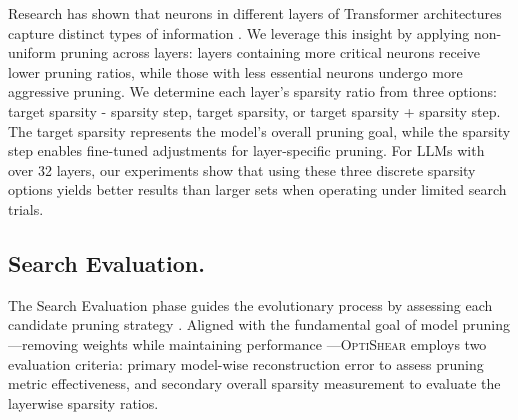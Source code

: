 Research has shown that neurons in different layers of Transformer architectures capture distinct types of information \citep{wang2020rethinking, zhang2021moefication}. We leverage this insight by applying non-uniform pruning across layers: layers containing more critical neurons receive lower pruning ratios, while those with less essential neurons undergo more aggressive pruning.
We determine each layer's sparsity ratio from three options: {target sparsity - sparsity step}, {target sparsity}, or {target sparsity + sparsity step}. The target sparsity represents the model's overall pruning goal, while the sparsity step enables fine-tuned adjustments for layer-specific pruning. For LLMs with over 32 layers, our experiments show that using these three discrete sparsity options yields better results than larger sets when operating under limited search trials.

\subsection{Search Evaluation.}
\label{sec:evaluation measurement}

The Search Evaluation phase guides the evolutionary process by assessing each candidate pruning strategy \citep{back1993overview}. Aligned with the fundamental goal of model pruning—removing weights while maintaining performance \citep{lecun1989optimal, han2015learning}—\textsc{OptiShear} employs two evaluation criteria: primary model-wise reconstruction error to assess pruning metric effectiveness, and secondary overall sparsity measurement to evaluate the layerwise sparsity ratios.


